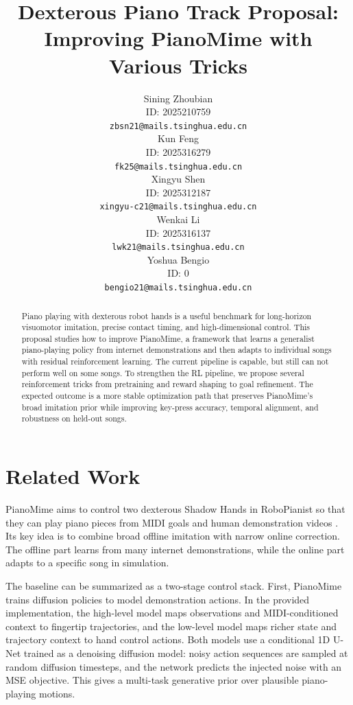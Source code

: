\documentclass{article}
\title{Dexterous Piano Track Proposal: Improving PianoMime with Various Tricks}
\author{Sining Zhoubian \\
ID: 2025210759 \\
\texttt{zbsn21@mails.tsinghua.edu.cn} \\
\And Kun Feng \\
ID: 2025316279 \\
\texttt{fk25@mails.tsinghua.edu.cn} \\
\And Xingyu Shen \\
ID: 2025312187 \\
\texttt{xingyu-c21@mails.tsinghua.edu.cn} \\
\And Wenkai Li \\
ID: 2025316137 \\
\texttt{lwk21@mails.tsinghua.edu.cn} \\
\And Yoshua Bengio \\
ID: 0 \\
\texttt{bengio21@mails.tsinghua.edu.cn} \\
}
\begin{document}
\maketitle

\begin{abstract}
Piano playing with dexterous robot hands is a useful benchmark for long-horizon visuomotor imitation, precise contact timing, and high-dimensional control. This proposal studies how to improve PianoMime, a framework that learns a generalist piano-playing policy from internet demonstrations and then adapts to individual songs with residual reinforcement learning. The current pipeline is capable, but still can not perform well on some songs. To strengthen the RL pipeline, we propose several reinforcement tricks from pretraining and reward shaping to goal refinement. The expected outcome is a more stable optimization path that preserves PianoMime's broad imitation prior while improving key-press accuracy, temporal alignment, and robustness on held-out songs.
\end{abstract}

\section{Related Work}

PianoMime aims to control two dexterous Shadow Hands in RoboPianist so that they can play piano pieces from MIDI goals and human demonstration videos \citep{qian2024pianomime,zakka2023robopianist}. Its key idea is to combine broad offline imitation with narrow online correction. The offline part learns from many internet demonstrations, while the online part adapts to a specific song in simulation.

The baseline can be summarized as a two-stage control stack. First, PianoMime trains diffusion policies to model demonstration actions. In the provided implementation, the high-level model maps observations and MIDI-conditioned context to fingertip trajectories, and the low-level model maps richer state and trajectory context to hand control actions. Both models use a conditional 1D U-Net trained as a denoising diffusion model: noisy action sequences are sampled at random diffusion timesteps, and the network predicts the injected noise with an MSE objective. This gives a multi-task generative prior over plausible piano-playing motions.
\end{document}
